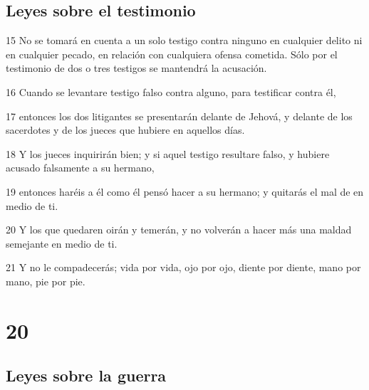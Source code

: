 \section{Leyes sobre el testimonio}

\par 15 No se tomará en cuenta a un solo testigo contra ninguno en cualquier delito ni en cualquier pecado, en relación con cualquiera ofensa cometida. Sólo por el testimonio de dos o tres testigos se mantendrá la acusación. 
\par 16 Cuando se levantare testigo falso contra alguno, para testificar contra él,
\par 17 entonces los dos litigantes se presentarán delante de Jehová, y delante de los sacerdotes y de los jueces que hubiere en aquellos días.
\par 18 Y los jueces inquirirán bien; y si aquel testigo resultare falso, y hubiere acusado falsamente a su hermano,
\par 19 entonces haréis a él como él pensó hacer a su hermano; y quitarás el mal de en medio de ti.
\par 20 Y los que quedaren oirán y temerán, y no volverán a hacer más una maldad semejante en medio de ti.
\par 21 Y no le compadecerás; vida por vida, ojo por ojo, diente por diente, mano por mano, pie por pie.

\chapter{20}

\section{Leyes sobre la guerra}

